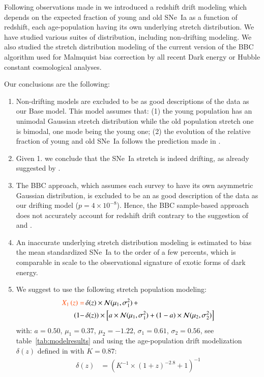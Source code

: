 \documentclass[]{aa} %
\newcommand{\nn}[1]{{\textcolor[rgb]{1, 0.27, 0}{#1}}}
\begin{document}
Following observations made in \cite{rigault2018} we introduced a redshift drift
modeling \nn{which} depends on the expected fraction of young and old SNe~Ia as a
function of redshift, each age-population having its own underlying stretch
distribution. We have studied various suites of distribution\nn{, including} non-drifting
modeling. We also studied the stretch distribution modeling \nn{of the}
current version of the BBC algorithm used for Malmquist bias correction by all
recent Dark energy or Hubble constant cosmological analyses. 

Our conclusions are the following:
\begin{enumerate}

    \item Non-drifting models are excluded to be as good descriptions of the
        data \nn{as} our Base model. This model assumes that: (1) the young
        population has an unimodal Gaussian stretch distribution while the old
        population stretch one is bimodal, one mode being the young one; (2) the
        evolution of the relative fraction of young and old SNe~Ia follows the
        prediction made in \cite{rigault2018}. 

    \item Given 1. we conclude that the SNe~Ia \nn{stretch} is indeed drifting, as
        already suggested by \citep[e.g.][]{howell2007}. 

    \item The BBC approach, which assumes each survey to have its own asymmetric
        Gaussian distribution, is excluded to be an as good description of the
        data as our drifting model ($p=4\times10^{-8}$). Hence, the BBC
        sample-based approach does not accurately account for redshift drift \nn{contrary
        to the suggestion of} \cite{scolnic2016} and \cite{scolnic2018a}.

    \item An inaccurate underlying stretch distribution modeling is estimated to
        bias the mean standardized SNe~Ia \nn{to} the order of a few percents, which
        is comparable in scale to the observational signature of exotic forms of
        dark energy.

    \item We suggest to use the following stretch population modeling:
        \begin{align}
            \label{eqconclusion:stretchz}
            \nn{X_1\left(z \right) =
            } &\,\delta(z)\times\mathcal{N}(\mu_1,\sigma_1^2)\,+\nonumber\\
            (1-&\,\delta(z)) \times  \left[a\times\mathcal{N}(\mu_1,\sigma_1^2) +
            (1-a)\times\mathcal{N}(\mu_2,\sigma_2^2)\right]
        \end{align}
    with: $a=0.50$, $\mu_1=0.37$, $\mu_2=-1.22$, $\sigma_1=0.61$,
    $\sigma_2=0.56$, see table~\ref{tab:modelresults} and using the
    age-population drift modelization $\delta(z)$ defined in \cite{rigault2018}
    with $K=0.87$:
    \begin{align}
        \delta(z) & = \left( K^{-1} \times (1+z)^{-2.8} +1 \right)^{-1}\nonumber
    \end{align}
\end{enumerate}
\end{document}
